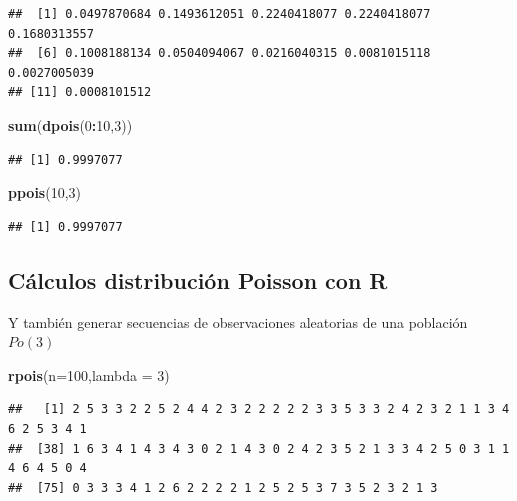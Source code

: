 \documentclass[]{book}
\newenvironment{Shaded}{\begin{snugshade}}{\end{snugshade}}
\newcommand{\DataTypeTok}[1]{\textcolor[rgb]{0.13,0.29,0.53}{#1}}
\newcommand{\DecValTok}[1]{\textcolor[rgb]{0.00,0.00,0.81}{#1}}
\newcommand{\KeywordTok}[1]{\textcolor[rgb]{0.13,0.29,0.53}{\textbf{#1}}}
\newcommand{\NormalTok}[1]{#1}
\newcommand{\OperatorTok}[1]{\textcolor[rgb]{0.81,0.36,0.00}{\textbf{#1}}}
\begin{document}
\begin{verbatim}
##  [1] 0.0497870684 0.1493612051 0.2240418077 0.2240418077 0.1680313557
##  [6] 0.1008188134 0.0504094067 0.0216040315 0.0081015118 0.0027005039
## [11] 0.0008101512
\end{verbatim}

\begin{Shaded}
\begin{Highlighting}[]
\KeywordTok{sum}\NormalTok{(}\KeywordTok{dpois}\NormalTok{(}\DecValTok{0}\OperatorTok{:}\DecValTok{10}\NormalTok{,}\DecValTok{3}\NormalTok{))}
\end{Highlighting}
\end{Shaded}

\begin{verbatim}
## [1] 0.9997077
\end{verbatim}

\begin{Shaded}
\begin{Highlighting}[]
\KeywordTok{ppois}\NormalTok{(}\DecValTok{10}\NormalTok{,}\DecValTok{3}\NormalTok{)}
\end{Highlighting}
\end{Shaded}

\begin{verbatim}
## [1] 0.9997077
\end{verbatim}

\hypertarget{cuxe1lculos-distribuciuxf3n-poisson-con-r}{%
\subsection{Cálculos distribución Poisson con R}\label{cuxe1lculos-distribuciuxf3n-poisson-con-r}}

Y también generar secuencias de observaciones aleatorias de una población \(Po(3)\)

\begin{Shaded}
\begin{Highlighting}[]
\KeywordTok{rpois}\NormalTok{(}\DataTypeTok{n=}\DecValTok{100}\NormalTok{,}\DataTypeTok{lambda =} \DecValTok{3}\NormalTok{)}
\end{Highlighting}
\end{Shaded}

\begin{verbatim}
##   [1] 2 5 3 3 2 2 5 2 4 4 2 3 2 2 2 2 2 3 3 5 3 3 2 4 2 3 2 1 1 3 4 6 2 5 3 4 1
##  [38] 1 6 3 4 1 4 3 4 3 0 2 1 4 3 0 2 4 2 3 5 2 1 3 3 4 2 5 0 3 1 1 4 6 4 5 0 4
##  [75] 0 3 3 3 4 1 2 6 2 2 2 2 1 2 5 2 5 3 7 3 5 2 3 2 1 3
\end{verbatim}
\end{document}
